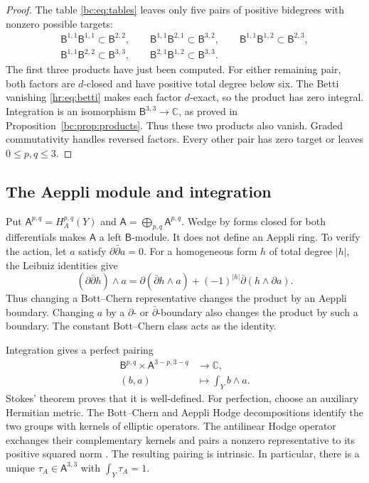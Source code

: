 \begin{proof}
The table \eqref{bc:eq:tables} leaves only five pairs of
positive bidegrees with nonzero possible targets:
\[
 \begin{gathered}
 \mathsf B^{1,1}\mathsf B^{1,1}\subset\mathsf B^{2,2},\qquad
 \mathsf B^{1,1}\mathsf B^{2,1}\subset\mathsf B^{3,2},\qquad
 \mathsf B^{1,1}\mathsf B^{1,2}\subset\mathsf B^{2,3},\\
 \mathsf B^{1,1}\mathsf B^{2,2}\subset\mathsf B^{3,3},\qquad
 \mathsf B^{2,1}\mathsf B^{1,2}\subset\mathsf B^{3,3}.
 \end{gathered}
\]
The first three products have just been computed.
For either remaining pair, both factors are $d$-closed and
have positive total degree below six.
The Betti vanishing \eqref{hr:eq:betti} makes each factor
$d$-exact, so the product has zero integral.
Integration is an isomorphism $\mathsf B^{3,3}\to\mathbb C$,
as proved in Proposition~\ref{bc:prop:products}.
Thus these two products also vanish.
Graded commutativity handles reversed factors.
Every other pair has zero target or leaves $0\le p,q\le3$.
\end{proof}

\subsection{The Aeppli module and integration}

Put $\mathsf A^{p,q}=H_A^{p,q}(Y)$ and
$\mathsf A=\bigoplus_{p,q}\mathsf A^{p,q}$.
Wedge by forms closed for both differentials makes $\mathsf A$
a left $\mathsf B$-module. It does not define an Aeppli ring.
To verify the action, let $a$ satisfy $\partial\bar\partial a=0$.
For a homogeneous form $h$ of total degree $|h|$, the Leibniz
identities give
\begin{equation}\label{bc:eq:Aeppli-boundary}
 (\partial\bar\partial h)\wedge a
 =\partial(\bar\partial h\wedge a)
       +(-1)^{|h|}\bar\partial(h\wedge\partial a).
\end{equation}
Thus changing a Bott--Chern representative changes the product
by an Aeppli boundary. Changing $a$ by a $\partial$- or
$\bar\partial$-boundary also changes the product by such a boundary.
The constant Bott--Chern class acts as the identity.

Integration gives a perfect pairing
\begin{equation}\label{bc:eq:integration-pairing}
 \begin{aligned}
 \mathsf B^{p,q}\times\mathsf A^{3-p,3-q}&\longrightarrow\mathbb C,\\
 (b,a)&\longmapsto\int_Y b\wedge a.
 \end{aligned}
\end{equation}
Stokes' theorem proves that it is well-defined.
For perfection, choose an auxiliary Hermitian metric.
The Bott--Chern and Aeppli Hodge decompositions identify the
two groups with kernels of elliptic operators.
The antilinear Hodge operator exchanges their complementary
kernels and pairs a nonzero representative to its positive squared norm
\cite[Theorem~2.2 and Section~2.c]{SchweitzerBC}.
The resulting pairing is intrinsic.
In particular, there is a unique $\tau_A\in\mathsf A^{3,3}$
with $\int_Y\tau_A=1$.

